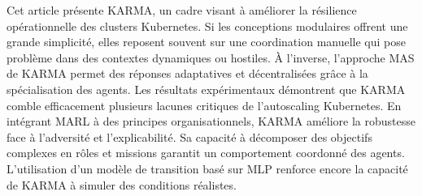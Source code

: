 Cet article présente KARMA, un cadre visant à améliorer la résilience opérationnelle des clusters Kubernetes. Si les conceptions modulaires offrent une grande simplicité, elles reposent souvent sur une coordination manuelle qui pose problème dans des contextes dynamiques ou hostiles. À l'inverse, l'approche MAS de KARMA permet des réponses adaptatives et décentralisées grâce à la spécialisation des agents.
Les résultats expérimentaux démontrent que KARMA comble efficacement plusieurs lacunes critiques de l'autoscaling Kubernetes. En intégrant MARL à des principes organisationnels, KARMA améliore la robustesse face à l'adversité et l'explicabilité. Sa capacité à décomposer des objectifs complexes en rôles et missions garantit un comportement coordonné des agents. L'utilisation d'un modèle de transition basé sur MLP renforce encore la capacité de KARMA à simuler des conditions réalistes.
%
%

